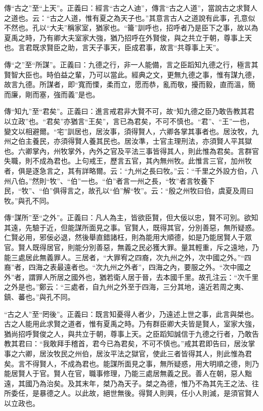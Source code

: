 {\noindent\zhuan{}\fzbyks 傳“古之”至“上天”。正義曰：經言“古之人迪”，傳言“古之人道”，當說古之求賢人之道也。云：“古之人道，惟有夏之為天子也。”其意言古人之道說有此事，孔意似不然也。孔以“大夫”稱家室，猶家也。“籥”訓呼也，招呼者乃是臣下之事，故以為夏禹之時，乃有卿大夫室家大強，猶乃招呼在外賢俊，與之共立于朝，尊事上天也。言君既求賢臣之助，言天子事天，臣成君事，故言“共尊事上天”。 \par}

{\noindent\zhuan{}\fzbyks 傳“之”至“所謀”。正義曰：九德之行，非一人能備，言之臣蹈知九德之行，極言其賢智大臣也。時伯益之輩，乃可以當此。經典之文，更無九德之事，惟有謀九德，故言九德。所謀者，即“寬而慄，柔而立，愿而恭，亂而敬，擾而毅，直而溫，簡而廉，剛而塞，強而義”是也。 \par}

{\noindent\zhuan{}\fzbyks 傳“知九”至“君矣”。正義曰：進言戒君非大賢不可，故“知九德之臣乃敢告教其君以立政”也。“君矣”亦猶言“王矣”，言已為君矣，不可不慎也。“君”、“王”一也，變文以相避爾。“宅”訓居也，居汝事，須得賢人，六卿各掌其事者也。居汝牧，九州之伯主養民，亦須得賢人養其民也。居汝準，士官主理刑法，亦須賢人平其獄也。六卿掌內，州牧掌外，內外之官及平法三事皆得其人，則此惟為君矣。言群官失職，則不成為君也。上句戒王，歷言五官，其內無州牧。此惟言三官，加州牧者，俱是逐急言之，其有詳略爾。云：“九州之長曰牧。”云：“千里之外設方伯，八州八伯。”然則“牧”、“伯”一也。“伯”者言一州之長，“牧”者言牧養下民，“牧”、“伯”俱得言之，故孔以“伯”解“牧”。云：“殷之州牧曰伯，虞夏及周曰牧。”與孔不同。 \par}

{\noindent\zhuan{}\fzbyks 傳“謀所”至“之外”。正義曰：凡人為主，皆欲臣賢，但大佞以忠，賢不可別。欲知其遠，先驗于近，但能謀所面見之事。官賢人，既得其官，分別善惡，無所疑惑。仁賢必用，邪佞必退，然後舉直錯諸枉，則為能用大順德，如是乃能居賢人于眾官。賢人既得居官，則能分別善惡，無義之民必獲大罪。量其輕重，斥之遠地，乃能三處居此無義罪人。三居者，“大罪宥之四裔，次九州之外，次中國之外。”“四裔”者，四海之表最遠者也。“次九州之外者”，四海之內，要服之外。“次中國之外”者，謂罪人所居之國外也，猶若衛人居于晉，去本國千里。故孔注云：“次千里之外是也。”鄭云：“三處者，自九州之外至于四海，三分其地，遠近若周之夷、鎮、蕃也。”與孔不同。 \par}

{\noindent\shu{}\fzkt “古之人”至“罔後”。正義曰：既言知憂得人者少，乃遠述上世之事，此言與桀也。古之人能用此求賢之道者，惟有夏禹之時。乃有群臣卿大夫皆是賢人，室家大強，猶尚招呼賢俊之人，與共立于朝，尊事上天。之臣蹈知誠信于九德之行者，乃敢告教其君曰：“我敢拜手稽首，君今已為君矣，不可不慎也。”戒其君即告曰，居汝掌事之六卿，居汝牧民之州伯，居汝平法之獄官，使此三者皆得其人，則此惟為君矣。言不得賢人，不成為君也。能謀所面見之事，無所疑惑，用大明順之德，則乃能居賢人于官。賢人在官，職事修理，乃能三處居無義之民。善人在朝，惡人黜遠，其國乃為治矣。及其末年，桀乃為天子。桀之為德，惟乃不為其先王之法、往所委任，是暴德之人。以此故，絕世無後。得賢人則興，任小人則滅，是須官賢人以立政也。 \par}

